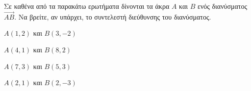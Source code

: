 Σε καθένα από τα παρακάτω ερωτήματα δίνονται τα άκρα $ A $ και $ B $ ενός διανύσματος $ \overrightarrow{AB} $. Να βρείτε, αν υπάρχει, το συντελεστή διεύθυνσης του διανύσματος.
\begin{multicols}{2}
\begin{alist}
\item $ A(1,2) $ και $ B(3,-2) $
\item $ A(4,1) $ και $ B(8,2) $
\item $ A(7,3) $ και $ B(5,3) $
\item $ A(2,1) $ και $ B(2,-3) $
\end{alist}
\end{multicols}
